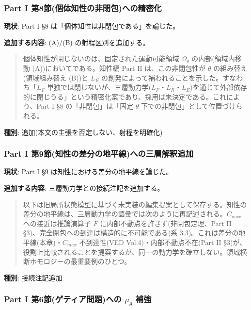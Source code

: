 \bigskip


\subsubsection{Part I 第8節(個体知性の非閉包)への精密化}


\textbf{現状}: Part I \S{}8 は「個体知性は非閉包である」を論じた。

\textbf{追加する内容}: (A)/(B) の射程区別を追加する。

\begin{quote}
個体知性が閉じないのは、固定された運動可能領域 $\Omega_\theta$ の内部(領域内移動 (A))においてである。知性編 Part II は、この非閉包性が $\theta$ の組み替え(領域組み替え (B))と $L_E$ の創発によって補われることを示した。すなわち「$L_F$ 単独では閉じないが、三層動力学($L_F$・$L_R$・$L_E$)を通じて外部依存的に閉じうる」という精密化案であり、採用は未決定である。これにより、Part I \S{}8 の「非閉包」は「固定 $\theta$ 下での非閉包」として位置づけられる。
\end{quote}


\textbf{種別}: 追加(本文の主張を否定しない、射程を明確化)

\bigskip


\subsubsection{Part I 第9節(知性の差分の地平線)への三層解釈追加}


\textbf{現状}: Part I \S{}9 は知性における差分の地平線を論じた。

\textbf{追加する内容}: 三層動力学との接続注記を追加する。

\begin{quote}
以下は旧局所状態模型に基づく未実装の編集提案として保存する。知性の差分の地平線は、三層動力学の語彙では次のように再記述される。$C_{max}$ への接近は推論演算子 $F$ に内部不動点を許さず(非閉包定理、Part II \S{}3)、完全閉包への到達は構造的に不可能である(系 3.3)。これは差分の地平線(本章)・$C_{max}$ 不到達性(VED Vol.4)・内部不動点不在(Part II \S{}3)が、役割上比較されることを提案するが、同一の動力学を確立しない。領域横断ホモロジーの最重要例のひとつ。
\end{quote}


\textbf{種別}: 接続注記追加

\bigskip


\subsubsection{Part I 第6節(ゲティア問題)への $\mu_\theta$ 補強}


